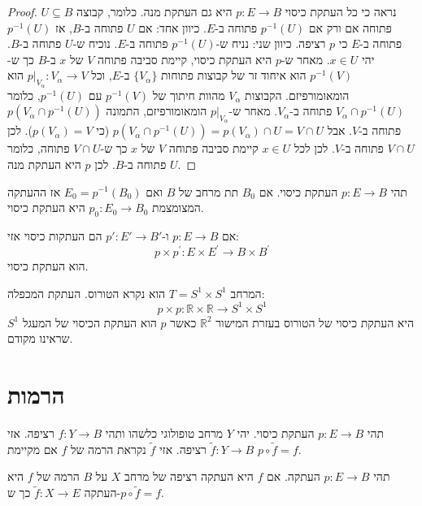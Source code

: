 \documentclass{tstextbook}
\begin{document}
\begin{proof}
נראה כי כל העתקת כיסוי \(p:E\to B\) היא גם העתקת מנה. כלומר, קבוצה \(U\subseteq B\) פתוחה אם ורק אם \(p^{-1}(U)\) פתוחה ב-\(E\).
כיוון אחד: אם \(U\) פתוחה ב-\(B\), אז \(p^{-1}(U)\) פתוחה ב-\(E\) כי \(p\) רציפה.
כיוון שני: נניח ש-\(p^{-1}(U)\) פתוחה ב-\(E\). נוכיח ש-\(U\) פתוחה ב-\(B\). יהי \(x\in U\). מאחר ש-\(p\) היא העתקת כיסוי, קיימת סביבה פתוחה \(V\) של \(x\) ב-\(B\) כך ש-\(p^{-1}(V)\) הוא איחוד זר של קבוצות פתוחות \(\{V_\alpha\}\) ב-\(E\), וכל \(p|_{V_\alpha}:V_\alpha\to V\) הוא הומאומורפיזם.
הקבוצות \(V_\alpha\) מהוות חיתוך של \(p^{-1}(V)\) עם \(p^{-1}(U)\), כלומר \(V_\alpha\cap p^{-1}(U)\) פתוחה ב-\(V_\alpha\). מאחר ש-\(p|_{V_\alpha}\) הומאומורפיזם, התמונה \(p(V_\alpha\cap p^{-1}(U))\) פתוחה ב-\(V\). אבל \(p(V_\alpha\cap p^{-1}(U))=p(V_\alpha)\cap U=V\cap U\) (כי \(p(V_\alpha)=V\)). לכן \(V\cap U\) פתוחה ב-\(V\).
לכן לכל \(x\in U\) קיימת סביבה פתוחה \(V\) של \(x\) כך ש-\(V\cap U\) פתוחה, כלומר \(U\) פתוחה ב-\(B\).
לכן \(p\) היא העתקת מנה.

\end{proof}
\begin{proposition}
תהי \(p:E\to B\) העתקת כיסוי. אם \(B_{0}\) תת מרחב של \(B\) ואם \(E_{0}=p ^{-1}(B_{0})\) אז ההעתקה המצומצמת \(p_{0}:E_{0}\to B_{0}\) היא העתקת כיסוי.

\end{proposition}
\begin{proposition}
אם \(p:E\to B\) ו-\(p':E'\to B'\) הם העתקות כיסוי אזי:
$$p\times p^{\prime}:E\times E^{\prime}\to B\times B^{\prime}$$
הוא העתקת כיסוי.

\end{proposition}
\begin{example}[טורוס]
המרחב \(T=S^{1}\times S^{1}\) הוא נקרא הטורוס. העתקת המכפלה:
$$p\times p:\mathbb{R}\times\mathbb{R}\longrightarrow S^{1}\times S^{1}$$
היא העתקת כיסוי של הטורוס בעזרת המישור \(\mathbb{R}^{2}\) כאשר \(p\) הוא העתקת הכיסוי של המעגל \(S^{1}\) שראינו מקודם.

\end{example}
\section{הרמות}

\begin{definition}[הרמה]
תהי \(p:E\to B\) העתקת כיסוי. יהי \(Y\) מרחב טופולוגי כלשהו ותהי \(f:Y\to B\) רציפה. אזי \(\tilde{f}:Y\to B\) רציפה. אזי \(\tilde{f}\) נקראת הרמה של \(f\) אם מקיימת \(p\circ \tilde{f}=f\).

\end{definition}
תהי \(p:E\to B\) העתקה. אם \(f\) היא העתקה רציפה של מרחב \(X\) על \(B\) הרמה של \(f\) היא העתקה \(\tilde{f}:X\to E\) כך ש-\(p\circ\tilde{f} = f\).
\end{document}
